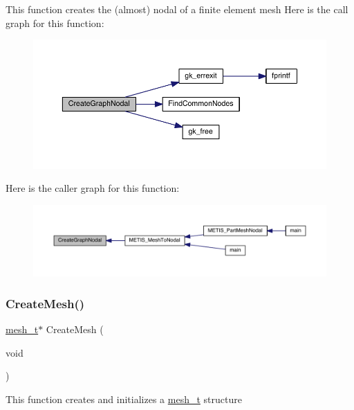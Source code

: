 This function creates the (almost) nodal of a finite element mesh Here is the call graph for this function\+:\nopagebreak
\begin{figure}[H]
\begin{center}
\leavevmode
\includegraphics[width=350pt]{a00927_ac6018a712a429b3c401adba913c2cae3_cgraph}
\end{center}
\end{figure}
Here is the caller graph for this function\+:\nopagebreak
\begin{figure}[H]
\begin{center}
\leavevmode
\includegraphics[width=350pt]{a00927_ac6018a712a429b3c401adba913c2cae3_icgraph}
\end{center}
\end{figure}
\mbox{\label{a00927_aec1a4bd83e832be7befbf6b03e9513ad}} 
\subsubsection{\texorpdfstring{Create\+Mesh()}{CreateMesh()}}
{\footnotesize\ttfamily \hyperlink{a00738}{mesh\+\_\+t}$\ast$ Create\+Mesh (\begin{DoxyParamCaption}\item[{void}]{ }\end{DoxyParamCaption})}

This function creates and initializes a \hyperlink{a00738}{mesh\+\_\+t} structure \mbox{\label{a00927_ab05bd1b0bb5bdaaf2e9dc8906675145c}} 
